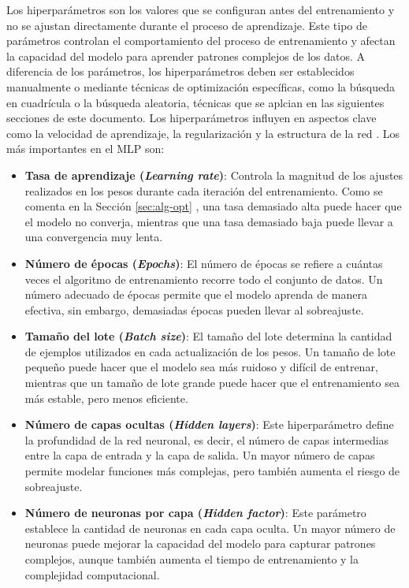 Los hiperparámetros son los valores que se configuran antes del entrenamiento y no se ajustan directamente durante el proceso de aprendizaje. Este tipo de parámetros controlan el comportamiento del proceso de entrenamiento y afectan la capacidad del modelo para aprender patrones complejos de los datos. A diferencia de los parámetros, los hiperparámetros deben ser establecidos manualmente o mediante técnicas de optimización específicas, como la búsqueda en cuadrícula o la búsqueda aleatoria, técnicas que se aplcian en las siguientes secciones de este documento. Los hiperparámetros influyen en aspectos clave como la velocidad de aprendizaje, la regularización y la estructura de la red \cite{chollet2018deep}. Los más importantes en el MLP son:

\begin{itemize}

    \item \textbf{Tasa de aprendizaje (\textit{Learning rate})}: Controla la magnitud de los ajustes realizados en los pesos durante cada iteración del entrenamiento. Como se comenta en la Sección \ref{sec:alg-opt} , una tasa demasiado alta puede hacer que el modelo no converja, mientras que una tasa demasiado baja puede llevar a una convergencia muy lenta.
    
    \item \textbf{Número de épocas (\textit{Epochs})}: El número de épocas se refiere a cuántas veces el algoritmo de entrenamiento recorre todo el conjunto de datos. Un número adecuado de épocas permite que el modelo aprenda de manera efectiva, sin embargo, demasiadas épocas pueden llevar al sobreajuste.
    
    \item \textbf{Tamaño del lote (\textit{Batch size})}: El tamaño del lote determina la cantidad de ejemplos utilizados en cada actualización de los pesos. Un tamaño de lote pequeño puede hacer que el modelo sea más ruidoso y difícil de entrenar, mientras que un tamaño de lote grande puede hacer que el entrenamiento sea más estable, pero menos eficiente.
    
    \item \textbf{Número de capas ocultas (\textit{Hidden layers})}: Este hiperparámetro define la profundidad de la red neuronal, es decir, el número de capas intermedias entre la capa de entrada y la capa de salida. Un mayor número de capas permite modelar funciones más complejas, pero también aumenta el riesgo de sobreajuste.
    
    \item \textbf{Número de neuronas por capa (\textit{Hidden factor})}: Este parámetro establece la cantidad de neuronas en cada capa oculta. Un mayor número de neuronas puede mejorar la capacidad del modelo para capturar patrones complejos, aunque también aumenta el tiempo de entrenamiento y la complejidad computacional.
\end{itemize}



